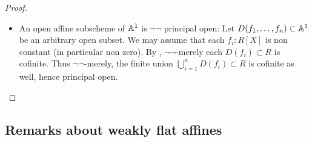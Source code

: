 \documentclass{article}
\begin{document}
\begin{proof}
	\begin{itemize}
		\item An open affine subscheme of $\mathbb{A}^1$ is $\lnot \lnot$ principal open: Let $D(f_1,\hdots,f_n) \subset \mathbb{A}^1$ be an arbitrary open subset. We may assume that each $f_i : R[X]$ is non constant (in particular non zero). By \todocite, $\lnot \lnot$-merely each $D(f_i) \subset R$ is cofinite. Thus $\lnot \lnot$-merely, the finite union $\bigcup_{i=1}^n D(f_i) \subset R$ is cofinite as well, hence principal open. %
	\end{itemize}
\end{proof}

\subsection{Remarks about weakly flat affines}
\end{document}
